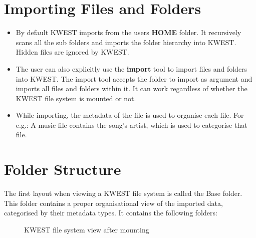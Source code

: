\section{Importing Files and Folders}

\begin{itemize}
\item By default KWEST imports from the users \textbf{HOME} folder. It recursively scans all the sub folders and imports the folder hierarchy into KWEST. Hidden files are ignored by KWEST.

\item The user can also explicitly use the \textbf{import} tool to import files and folders into KWEST. The import tool accepts the folder to import as argument and imports all files and folders within it. It can work regardless of whether the KWEST file system is mounted or not.

\item While importing, the metadata of the file is used to organise each file. For e.g.: A music file contains the song's artist, which is used to categorise that file.
\end{itemize}

\section{Folder Structure}

The first layout when viewing a KWEST file system is called the Base folder. This folder contains a proper organisational view of the imported data, categorised by their metadata types. It contains the following folders:

\begin{figure}[htb]
\centering
\setlength\fboxsep{0pt}
\setlength\fboxrule{0.5pt}
\caption{KWEST file system view after mounting}
\label{fig:dfd0}
\end{figure}

